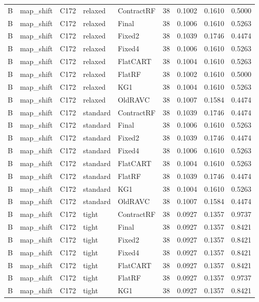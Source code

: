 \begin{longtable}{@{}lllllllll@{}}
B & map\_shift & C172 & relaxed & ContractRF & 38 & 0.1002 & 0.1610 & 0.5000\\
B & map\_shift & C172 & relaxed & Final & 38 & 0.1006 & 0.1610 & 0.5263\\
B & map\_shift & C172 & relaxed & Fixed2 & 38 & 0.1039 & 0.1746 & 0.4474\\
B & map\_shift & C172 & relaxed & Fixed4 & 38 & 0.1006 & 0.1610 & 0.5263\\
B & map\_shift & C172 & relaxed & FlatCART & 38 & 0.1004 & 0.1610 & 0.5263\\
B & map\_shift & C172 & relaxed & FlatRF & 38 & 0.1002 & 0.1610 & 0.5000\\
B & map\_shift & C172 & relaxed & KG1 & 38 & 0.1004 & 0.1610 & 0.5263\\
B & map\_shift & C172 & relaxed & OldRAVC & 38 & 0.1007 & 0.1584 & 0.4474\\
B & map\_shift & C172 & standard & ContractRF & 38 & 0.1039 & 0.1746 & 0.4474\\
B & map\_shift & C172 & standard & Final & 38 & 0.1006 & 0.1610 & 0.5263\\
B & map\_shift & C172 & standard & Fixed2 & 38 & 0.1039 & 0.1746 & 0.4474\\
B & map\_shift & C172 & standard & Fixed4 & 38 & 0.1006 & 0.1610 & 0.5263\\
B & map\_shift & C172 & standard & FlatCART & 38 & 0.1004 & 0.1610 & 0.5263\\
B & map\_shift & C172 & standard & FlatRF & 38 & 0.1039 & 0.1746 & 0.4474\\
B & map\_shift & C172 & standard & KG1 & 38 & 0.1004 & 0.1610 & 0.5263\\
B & map\_shift & C172 & standard & OldRAVC & 38 & 0.1007 & 0.1584 & 0.4474\\
B & map\_shift & C172 & tight & ContractRF & 38 & 0.0927 & 0.1357 & 0.9737\\
B & map\_shift & C172 & tight & Final & 38 & 0.0927 & 0.1357 & 0.8421\\
B & map\_shift & C172 & tight & Fixed2 & 38 & 0.0927 & 0.1357 & 0.8421\\
B & map\_shift & C172 & tight & Fixed4 & 38 & 0.0927 & 0.1357 & 0.8421\\
B & map\_shift & C172 & tight & FlatCART & 38 & 0.0927 & 0.1357 & 0.8421\\
B & map\_shift & C172 & tight & FlatRF & 38 & 0.0927 & 0.1357 & 0.9737\\
B & map\_shift & C172 & tight & KG1 & 38 & 0.0927 & 0.1357 & 0.8421\\

\end{longtable}
